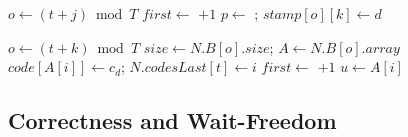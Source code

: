 \begin{algorithm}
\begin{algorithmic}[1]
        \State $o \gets (t + j) \bmod T$
        \State $\mathit{first} \gets$  $+ 1$
            \State $p \gets$ 
                \State {}; $\mathit{stamp}[o][k] \gets d$
            \EndIf
        \EndFor
        \State {}
    \EndFor
\EndProcedure
\end{algorithmic}
\end{algorithm}

\begin{algorithm}
\caption{Writing the codes of the frontier of level $d$ in the variant, as thread $t$ runs it, with $N$ and $N'$ as in Algorithm~\ref{alg:mem}.}
\label{alg:mem-codes}
\begin{algorithmic}[1]
        \State $o \gets (t + k) \bmod T$
            \State $\mathit{size} \gets N.B[o].\mathit{size}$; $A \gets N.B[o].\mathit{array}$
                    \State $\mathit{code}[A[i]] \gets c_d$; $N.\mathit{codesLast}[t] \gets i$
                \EndFor
            \Else
                \State $\mathit{first} \gets$  $+ 1$
                    \State $u \gets A[i]$
                \EndFor
            \EndIf
        \EndIf
        \State {}
    \EndFor
\EndProcedure
\end{algorithmic}
\end{algorithm}

\subsection{Correctness and Wait-Freedom}
\label{sec:mem-proof}

